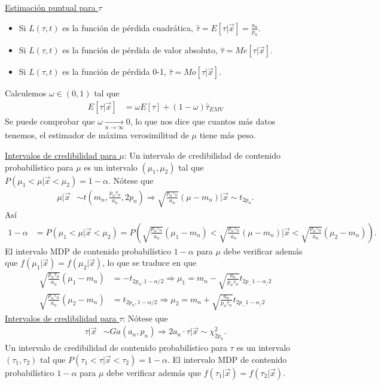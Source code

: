 \underline{Estimación puntual para $\tau$}
\begin{itemize}
    \item Si $L(\tau,t)$ es la función de pérdida cuadrática, $\widehat{\tau} = E[\tau |  \vec{x}] = \frac{a_n}{p_n}$.
    \item Si $L(\tau,t)$ es la función de pérdida de valor absoluto, $\widehat{\tau} = Me[\tau |  \vec{x}]$.
    \item Si $L(\tau,t)$ es la función de pérdida 0-1, $ \widehat{\tau} = Mo[\tau |  \vec{x}]$.
\end{itemize}
Calculemos $\omega \in (0,1)$ tal que
\begin{align*}
    E[\tau  | \vec{x}] & = \omega E[\tau]  + (1 - \omega) \widehat{\tau }_{EMV}
\end{align*}
Se puede comprobar que $\omega \xrightarrow[n \to \infty]{} 0$, lo que nos dice que cuantos más datos tenemos, el estimador de máxima verosimilitud de $\mu$ tiene más peso.

\underline{Intervalos de credibilidad para $\mu$}: Un intervalo de credibilidad de contenido probabilístico para $\mu$ es un intervalo $(\mu_1,\mu_2)$ tal que $P(\mu_1 < \mu | \vec{x} < \mu_2) = 1 - \alpha$. Nótese que
\begin{align*}
    \mu | \vec{x} & \sim t\left(m_n, \frac{p_n\tau_n}{a_n}, 2p_n \right) \Longrightarrow \sqrt{\frac{p_n\tau_n}{a_n}}(\mu - m_n) | \vec{x} \sim t_{2p_n}.
\end{align*}
Así
\begin{align*}
    1 - \alpha & = P(\mu_1 < \mu | \vec{x} < \mu_2) = P\left(\sqrt{\frac{p_n\tau_n}{a_n}}(\mu_1 - m_n) < \sqrt{\frac{p_n\tau_n}{a_n}}(\mu - m_n) | \vec{x} < \sqrt{\frac{p_n\tau_n}{a_n}}(\mu_2 - m_n) \right).
\end{align*}
El intervalo MDP de contenido probabilístico $1-\alpha$ para $\mu$ debe verificar además que $f(\mu_1 | \vec{x}) = f(\mu_2 | \vec{x})$, lo que se traduce en que
\begin{align*}
    \sqrt{\frac{p_n\tau_n}{a_n}}(\mu_1 - m_n) & = -t_{2p_n, 1 - \alpha/2} \Longrightarrow \mu_1 = m_n - \sqrt{\frac{a_n}{p_n\tau_n}}t_{2p_ - 1 -\alpha_/2} \\
    \sqrt{\frac{p_n\tau_n}{a_n}}(\mu_2 - m_n) & = t_{2p_n, 1 - \alpha/2} \Longrightarrow \mu_2 = m_n + \sqrt{\frac{a_n}{p_n\tau_n}}t_{2p_ - 1 -\alpha_/2}
\end{align*}
\underline{Intervalos de credibilidad para $\tau$}: Nótese que
\begin{align*}
    \tau | \vec{x} & \sim Ga(a_n,p_n) \Longrightarrow 2a_n \cdot \tau | \vec{x} \sim \chi^2_{2p_n}.
\end{align*}
Un intervalo de credibilidad de contenido probabilístico para $\tau$ es un intervalo $(\tau_1,\tau_2)$ tal que $P(\tau_1 < \tau | \vec{x} < \tau_2) = 1 - \alpha$. El intervalo MDP de contenido probabilístico $1-\alpha$ para $\mu$ debe verificar además que $f(\tau_1 | \vec{x}) = f(\tau_2 | \vec{x})$.

